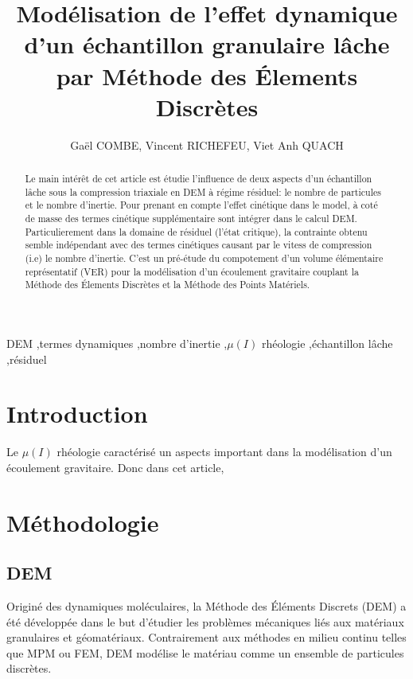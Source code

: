 \documentclass[5p,authoryear,square]{elsarticle}
\begin{document}
\begin{frontmatter}

\title{\textbf{Modélisation de l'effet dynamique d'un échantillon granulaire lâche par Méthode des Élements Discrètes}}

\author{Gaël COMBE, Vincent RICHEFEU, Viet Anh QUACH}
\address{Laboratoire 3SR, Université Grenoble Alpes}


\begin{abstract}
Le main intérêt de cet article est étudie l'influence de deux aspects d'un échantillon lâche sous la compression triaxiale en DEM à régime résiduel: le nombre de particules et le nombre d'inertie. 
Pour prenant en compte l'effet cinétique dans le model, à coté de masse des termes cinétique supplémentaire sont intégrer dans le calcul DEM.
Particulierement dans la domaine de résiduel (l'état critique),  la contrainte obtenu semble indépendant avec des termes cinétiques causant par le vitess de compression (i.e) le nombre d'inertie.
C'est un pré-étude du compotement d'un volume élémentaire représentatif (VER) pour la modélisation d'un écoulement gravitaire couplant la Méthode des Élements Discrètes et la Méthode des Points Matériels.

\end{abstract}

\begin{keyword}
DEM \sep termes dynamiques \sep nombre d'inertie \sep $\mu(I)$ rhéologie \sep échantillon lâche \sep résiduel
\end{keyword}

\end{frontmatter}

\section{Introduction}\label{introduction}
Le $\mu(I)$ rhéologie caractérisé un aspects important dans la modélisation d'un écoulement gravitaire.  
Donc dans cet article, 
\section{Méthodologie}\label{methode}

\subsection{DEM}\label{dem}
Originé des dynamiques moléculaires, la Méthode des Éléments Discrets (DEM) a été développée dans le but d'étudier les problèmes mécaniques liés aux matériaux granulaires et géomatériaux. Contrairement aux méthodes en milieu continu telles que MPM ou FEM, DEM modélise le matériau comme un ensemble de particules discrètes.
\end{document}

